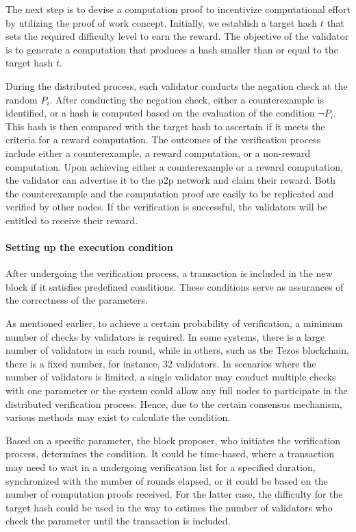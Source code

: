\documentclass[runningheads]{llncs}
\begin{document}
The next step is to devise a computation proof to incentivize computational effort by utilizing the proof of work concept. Initially, we establish a target hash $t$ that sets the required difficulty level to earn the reward. The objective of the validator is to generate a computation that produces a hash smaller than or equal to the target hash $t$. 

During the distributed process, each validator conducts the negation check at the random $P_i$. After conducting the negation check, either a counterexample is identified, or a hash is computed based on the evaluation of the condition $\neg P_{i}$. This hash is then compared with the target hash to ascertain if it meets the criteria for a reward computation. The outcomes of the verification process include either a counterexample, a reward computation, or a non-reward computation. Upon achieving either a counterexample or a reward computation, the validator can advertise it to the p2p network and claim their reward. Both the counterexample and the computation proof are easily to be replicated and verified by other nodes. If the verification is successful, the validators will be entitled to receive their reward.

\paragraph{Setting up the execution condition}  After undergoing the verification process, a transaction is included in the new block if it satisfies predefined conditions. These conditions serve as assurances of the correctness of the parameters. 

As mentioned earlier, to achieve a certain probability of verification, a minimum number of checks by validators is required. In some systems, there is a large number of validators in each round, while in others, such as the Tezos blockchain, there is a fixed number, for instance, 32 validators. In scenarios where the number of validators is limited, a single validator may conduct multiple checks with one parameter or the system could allow any full nodes to participate in the distributed verification process. Hence, due to the certain consensus mechanism, various methods may exist to calculate the condition.

Based on a specific parameter, the block proposer, who initiates the verification process, determines the condition. It could be time-based, where a transaction may need to wait in a undergoing verification list for a specified duration, synchronized with the number of rounds elapsed, or it could be based on the number of computation proofs received. For the latter case,  the difficulty for the target hash could be used in the way to estimes the number of validators who check the parameter until the transaction is included.
\end{document}
